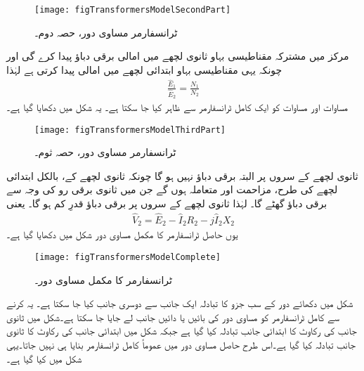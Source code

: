 \begin{figure}
\centering
\texttt{[image: figTransformersModelSecondPart]}
\caption{ٹرانسفارمر مساوی دور، حصہ دوم۔}
\label{شکل_ٹرانسفارمر_ماڈل_حصہ_دوم}
\end{figure}

مرکز میں مشترکہ مقناطیسی بہاو ثانوی لچھے میں امالی برقی دباؤ  پیدا کرے گی اور چونکہ یہی مقناطیسی بہاو ابتدائی لچھے میں   امالی پیدا کرتی ہے لہٰذا
\begin{align}\label{مساوات_ٹرانسفارمر_دباؤ_رو_شرح}
\frac{\hat{E}_1}{\hat{E}_2}=\frac{N_1}{N_2}
\end{align}
مساوات  اور مساوات   کو ایک کامل ٹرانسفارمر سے ظاہر کیا جا سکتا ہے۔ یہ شکل   میں دکھایا گیا ہے۔
\begin{figure}
\centering
\texttt{[image: figTransformersModelThirdPart]}
\caption{ٹرانسفارمر مساوی دور، حصہ ثوم۔}
\label{شکل_ٹرانسفارمر_ماڈل_حصہ_ثوم}
\end{figure}

ثانوی لچھے کے سروں پر البتہ   برقی دباؤ نہیں ہو گا چونکہ ثانوی لچھے کے، بالکل ابتدائی لچھے کی طرح، مزاحمت   اور متعاملہ   ہوں گے جن میں ثانوی برقی رو   کی وجہ سے برقی دباؤ گھٹے گا۔  لہٰذا ثانوی لچھے کے سروں پر برقی دباؤ  قدرِ کم ہو گا۔ یعنی
\begin{align}
\hat{V}_2=\hat{E}_2-\hat{I}_2 R_2-j \hat{I}_2 X_2
\end{align}
	یوں حاصل ٹرانسفارمر کا مکمل مساوی دور شکل   میں دکھایا گیا ہے۔
\begin{figure}
\centering
\texttt{[image: figTransformersModelComplete]}
\caption{ٹرانسفارمر کا مکمل مساوی دور۔}
\label{شکل_ٹرانسفارمر_مکمل_ماڈل}
\end{figure}

شکل   میں دکھائے دور کے سب جزو کا تبادلہ ایک جانب سے دوسری جانب کیا جا سکتا ہے۔ یہ کرنے سے کامل ٹرانسفارمر کو مساوی دور کی بائیں یا دائیں جانب لے جایا جا سکتا ہے۔شکل    میں ثانوی جانب کی رکاوٹ کا ابتدائی جانب تبادلہ کیا گیا ہے جبکہ شکل    میں ابتدائی جانب کی رکاوٹ کا ثانوی جانب تبادلہ کیا گیا ہے۔اس طرح حاصل مساوی دور میں عموماً کامل ٹرانسفارمر بنایا ہی نہیں جاتا۔یہی شکل    میں کیا گیا ہے۔

